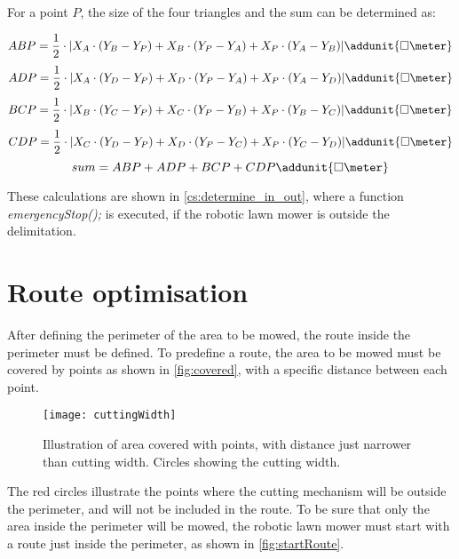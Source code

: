 For a point $P$, the size of the four triangles and the sum can be determined as:

\begin{equation}
		ABP=\frac{1}{2}\cdot|X_A\cdot (Y_B-Y_P)+X_B\cdot (Y_P-Y_A)+X_P\cdot (Y_A-Y_B)|  \addunit{\square\meter}
	\end{equation}
	\begin{equation}
		ADP=\frac{1}{2}\cdot|X_A\cdot (Y_D-Y_P)+X_D\cdot (Y_P-Y_A)+X_P\cdot (Y_A-Y_D)|  \addunit{\square\meter}
	\end{equation}
	\begin{equation}
		BCP=\frac{1}{2}\cdot|X_B\cdot (Y_C-Y_P)+X_C\cdot (Y_P-Y_B)+X_P\cdot (Y_B-Y_C)|  \addunit{\square\meter}
	\end{equation}
	\begin{equation}
		CDP=\frac{1}{2}\cdot|X_C\cdot (Y_D-Y_P)+X_D\cdot (Y_P-Y_C)+X_P\cdot (Y_C-Y_D)|  \addunit{\square\meter}
	\end{equation}
	\begin{equation}
	sum = ABP+ADP+BCP+CDP \addunit{\square\meter}
	\end{equation}

	
These calculations are shown in \autoref{cs:determine_in_out}, where a function \textit{emergencyStop();} is executed, if the robotic lawn mower is outside the delimitation.



\section{Route optimisation}
After defining the perimeter of the area to be mowed, the route inside the perimeter must be defined. To predefine a route, the area to be mowed must be covered by points as shown in \autoref{fig:covered}, with a specific distance between each point.

\begin{figure}[htb]
\centering
\texttt{[image: cuttingWidth]}
\caption{Illustration of area covered with points, with distance just narrower than cutting width. Circles showing the cutting width.}
\label{fig:covered}
\end{figure} 
 
The red circles illustrate the points where the cutting mechanism will be outside the perimeter, and will not be included in the route. To be sure that only the area inside the perimeter will be mowed, the robotic lawn mower must start with a route just inside the perimeter, as shown in \autoref{fig:startRoute}.

